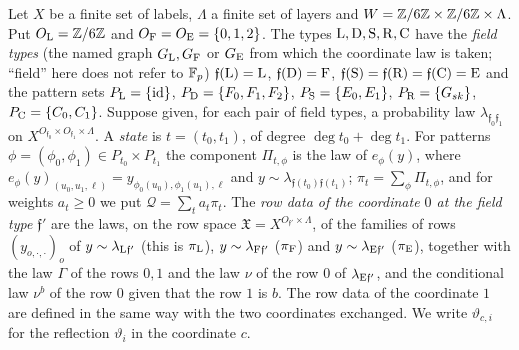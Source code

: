 \begin{definition}\label{def:two-coordinate-five-type}
Let $X$ be a finite set of labels, $\Lambda$ a finite set of layers and
$W=\mathbb Z/6\mathbb Z\times\mathbb Z/6\mathbb Z\times\Lambda$. Put $O_{\rm L}=\mathbb Z/6\mathbb Z$ and
$O_{\rm F}=O_{\rm E}=\{0,1,2\}$. The types $\rm L,D,S,R,C$ have
the \emph{field types} (the named graph $G_{\rm L},G_{\rm F}$ or
$G_{\rm E}$ from which the coordinate law is taken; ``field''
here does not refer to $\mathbb F_p$)
$\mathfrak f({\rm L})={\rm L}$, $\mathfrak f({\rm D})={\rm F}$,
$\mathfrak f({\rm S})=\mathfrak f({\rm R})=\mathfrak f({\rm C})={\rm E}$ and the
pattern sets $P_{\rm L}=\{{\rm id}\}$, $P_{\rm D}=\{F_0,F_1,F_2\}$,
$P_{\rm S}=\{E_0,E_1\}$, $P_{\rm R}=\{G_{sk}\}$, $P_{\rm C}=\{C_0,C_1\}$. Suppose
given, for each pair of field types, a probability law
$\lambda_{\mathfrak f_0\mathfrak f_1}$ on $X^{O_{\mathfrak f_0}\times O_{\mathfrak f_1}
\times\Lambda}$. A \emph{state} is $t=(t_0,t_1)$, of degree
$\deg t_0+\deg t_1$. For patterns $\phi=(\phi_0,\phi_1)\in P_{t_0}\times P_{t_1}$
the component $\Pi_{t,\phi}$ is the law of $e_\phi(y)$, where
$e_\phi(y)_{(u_0,u_1,\ell)}=y_{\phi_0(u_0),\phi_1(u_1),\ell}$ and
$y\sim\lambda_{\mathfrak f(t_0)\mathfrak f(t_1)}$; $\pi_t=\sum_\phi\Pi_{t,\phi}$, and
for weights $a_t\ge0$ we put $\mathcal Q=\sum_ta_t\pi_t$. The \emph{row data
of the coordinate $0$ at the field type $\mathfrak f'$} are the laws, on the
row space $\mathfrak X=X^{O_{\mathfrak f'}\times\Lambda}$, of the families of rows
$(y_{o,\cdot,\cdot})_o$ of $y\sim\lambda_{{\rm L}\mathfrak f'}$ (this is
$\pi_{\rm L}$), $y\sim\lambda_{{\rm F}\mathfrak f'}$ ($\pi_{\rm F}$) and
$y\sim\lambda_{{\rm E}\mathfrak f'}$ ($\pi_{\rm E}$), together with the law
$\Gamma$ of the rows $0,1$ and the law $\nu$ of the row $0$ of
$\lambda_{{\rm E}\mathfrak f'}$, and the conditional law $\nu^b$ of the row $0$
given that the row $1$ is $b$. The row data of the coordinate $1$ are defined
in the same way with the two coordinates exchanged. We write
$\vartheta_{c,i}$ for the reflection $\vartheta_i$ in the coordinate $c$.
\end{definition}

